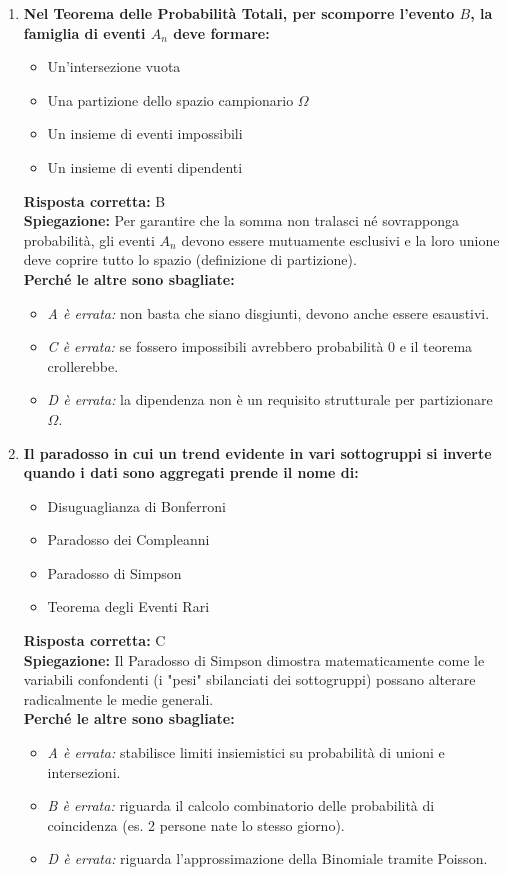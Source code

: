 \documentclass[12pt, a4paper]{article}
\begin{document}
\begin{enumerate}[label=\textbf{\arabic*.}]
    \item \textbf{Nel Teorema delle Probabilità Totali, per scomporre l'evento $B$, la famiglia di eventi $A_n$ deve formare:}
    \begin{itemize}
        \item[A)] Un'intersezione vuota
        \item[B)] Una partizione dello spazio campionario $\Omega$
        \item[C)] Un insieme di eventi impossibili
        \item[D)] Un insieme di eventi dipendenti
    \end{itemize}
    \textbf{Risposta corretta:} B \\
    \textbf{Spiegazione:} Per garantire che la somma non tralasci né sovrapponga probabilità, gli eventi $A_n$ devono essere mutuamente esclusivi e la loro unione deve coprire tutto lo spazio (definizione di partizione). \\
    \textbf{Perché le altre sono sbagliate:}
    \begin{itemize}
        \item \textit{A è errata:} non basta che siano disgiunti, devono anche essere esaustivi.
        \item \textit{C è errata:} se fossero impossibili avrebbero probabilità 0 e il teorema crollerebbe.
        \item \textit{D è errata:} la dipendenza non è un requisito strutturale per partizionare $\Omega$.
    \end{itemize}

    \item \textbf{Il paradosso in cui un trend evidente in vari sottogruppi si inverte quando i dati sono aggregati prende il nome di:}
    \begin{itemize}
        \item[A)] Disuguaglianza di Bonferroni
        \item[B)] Paradosso dei Compleanni
        \item[C)] Paradosso di Simpson
        \item[D)] Teorema degli Eventi Rari
    \end{itemize}
    \textbf{Risposta corretta:} C \\
    \textbf{Spiegazione:} Il Paradosso di Simpson dimostra matematicamente come le variabili confondenti (i "pesi" sbilanciati dei sottogruppi) possano alterare radicalmente le medie generali. \\
    \textbf{Perché le altre sono sbagliate:}
    \begin{itemize}
        \item \textit{A è errata:} stabilisce limiti insiemistici su probabilità di unioni e intersezioni.
        \item \textit{B è errata:} riguarda il calcolo combinatorio delle probabilità di coincidenza (es. 2 persone nate lo stesso giorno).
        \item \textit{D è errata:} riguarda l'approssimazione della Binomiale tramite Poisson.
    \end{itemize}


\end{enumerate}
\end{document}
